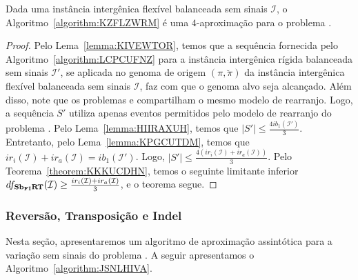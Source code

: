 \begin{theorem}\label{theorem:DSCDQRUP}
Dada uma instância intergênica flexível balanceada sem sinais $\mathcal{I}$, o Algoritmo~\ref{algorithm:KZFLZWRM} é uma $4$-aproximação para o problema \SbFIRT{}.
\end{theorem}
\begin{proof}
Pelo Lema~\ref{lemma:KIVEWTOR}, temos que a sequência fornecida pelo Algoritmo~\ref{algorithm:LCPCUFNZ} para a instância intergênica rígida balanceada sem sinais $\mathcal{I'}$, se aplicada no genoma de origem $(\pi,\breve\pi)$ da instância intergênica flexível balanceada sem sinais $\mathcal{I}$, faz com que o genoma alvo seja alcançado. Além disso, note que os problemas \SbIRT{} e \SbFIRT{} compartilham o mesmo modelo de rearranjo. Logo, a sequência $S'$ utiliza apenas eventos permitidos pelo modelo de rearranjo do problema \SbFIRT{}. Pelo Lema~\ref{lemma:HIIRAXUH}, temos que $|S'| \le \frac{4ib_1(\mathcal{I}')}{3}$. Entretanto, pelo Lema~\ref{lemma:KPGCUTDM}, temos que $ir_i(\mathcal{I}) + ir_a(\mathcal{I}) = ib_1(\mathcal{I'})$. Logo, $|S'| \le \frac{4(ir_i(\mathcal{I}) + ir_a(\mathcal{I}))}{3}$. Pelo Teorema~\ref{theorem:KKKUCDHN}, temos o seguinte limitante inferior $df_{\textbf{Sb\textsubscript{FI}RT}}(\mathcal{I}) \ge \frac{ir_i(\mathcal{I}) + ir_a(\mathcal{I})}{3}$, e o teorema segue.
\end{proof}

\subsubsection{Reversão, Transposição e Indel}

Nesta seção, apresentaremos um algoritmo de aproximação assintótica para a variação sem sinais do problema \SbFIRTI{}. A seguir apresentamos o Algoritmo~\ref{algorithm:JSNLHIVA}.



